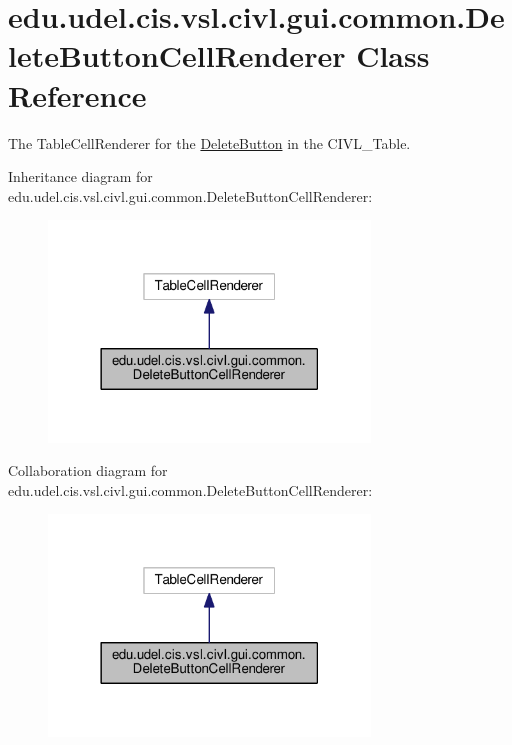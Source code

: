 \hypertarget{classedu_1_1udel_1_1cis_1_1vsl_1_1civl_1_1gui_1_1common_1_1DeleteButtonCellRenderer}{}\section{edu.\+udel.\+cis.\+vsl.\+civl.\+gui.\+common.\+Delete\+Button\+Cell\+Renderer Class Reference}
\label{classedu_1_1udel_1_1cis_1_1vsl_1_1civl_1_1gui_1_1common_1_1DeleteButtonCellRenderer}


The Table\+Cell\+Renderer for the \hyperlink{classedu_1_1udel_1_1cis_1_1vsl_1_1civl_1_1gui_1_1common_1_1DeleteButton}{Delete\+Button} in the C\+I\+V\+L\+\_\+\+Table.  




Inheritance diagram for edu.\+udel.\+cis.\+vsl.\+civl.\+gui.\+common.\+Delete\+Button\+Cell\+Renderer\+:
\nopagebreak
\begin{figure}[H]
\begin{center}
\leavevmode
\includegraphics[width=242pt]{classedu_1_1udel_1_1cis_1_1vsl_1_1civl_1_1gui_1_1common_1_1DeleteButtonCellRenderer__inherit__graph}
\end{center}
\end{figure}


Collaboration diagram for edu.\+udel.\+cis.\+vsl.\+civl.\+gui.\+common.\+Delete\+Button\+Cell\+Renderer\+:
\nopagebreak
\begin{figure}[H]
\begin{center}
\leavevmode
\includegraphics[width=242pt]{classedu_1_1udel_1_1cis_1_1vsl_1_1civl_1_1gui_1_1common_1_1DeleteButtonCellRenderer__coll__graph}
\end{center}
\end{figure}
